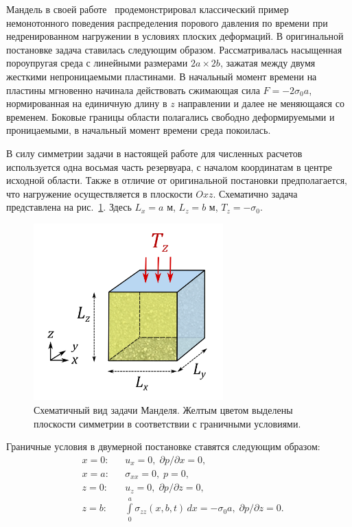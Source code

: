 Мандель в своей работе~\cite{mandel_1953} продемонстрировал классический
пример немонотонного поведения распределения порового давления по времени при недренированном нагружении
в условиях плоских деформаций.
В оригинальной постановке задача ставилась следующим образом. Рассматривалась насыщенная пороупругая среда
с линейными размерами $2a \times 2b$, зажатая между двумя жесткими непроницаемыми пластинами.
В начальный момент времени на пластины мгновенно начинала действовать сжимающая сила $F = -2\sigma_0a$,
нормированная на единичную длину в $z$ направлении и далее не меняющаяся со временем. 
Боковые границы области полагались свободно деформируемыми и проницаемыми, в начальный момент времени
среда покоилась. 

В силу симметрии задачи в настоящей работе для численных расчетов используется одна восьмая часть резервуара,
с началом координатам в центре исходной области. Также в отличие от оригинальной постановки предполагается,
что нагружение осуществляется в плоскости $Oxz$. Схематично задача представлена на рис.~\ref{fig:mandel}.
Здесь $L_x = a$ м, $L_z = b$ м, $T_z = -\sigma_0$.
%
\begin{figure}[h!]
\centering
\includegraphics[width=0.65\textwidth]{./figs/mandel.png}
\caption{Схематичный вид задачи Манделя. Желтым цветом выделены плоскости
симметрии в соответствии с граничными условиями.}\label{fig:mandel}
\end{figure}
% 

Граничные условия в двумерной постановке ставятся следующим образом:
%
\begin{equation}
\begin{aligned}
\label{eq:bcMan}
%
& x = 0: & &u_x = 0, \;  \partial p / \partial x = 0, \\
& x = a: & &\sigma_{xx} = 0, \;p = 0,\\
& z = 0: &  &u_z = 0, \; \partial p / \partial z = 0,\\
& z = b: &  &\int \limits_{0}^{a} \sigma_{zz}(x,b,t)\, dx = -\sigma_0 a, \; \partial p / \partial z = 0.
%
\end{aligned}
\end{equation}
%


